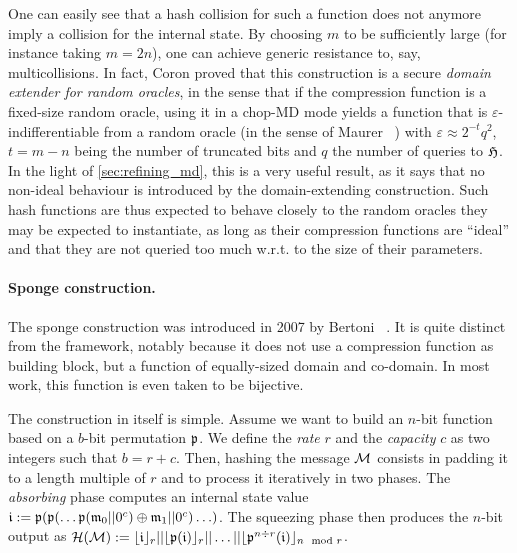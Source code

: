 One can easily see that a hash collision for such a function does not anymore imply a collision for the internal state. By choosing $m$ to be sufficiently large (for instance taking $m = 2n$),
one can achieve generic resistance to, say, multicollisions. In fact, Coron \etal proved that this construction is a secure \emph{domain extender for random oracles}, in the sense that
if the compression function is a fixed-size random oracle, using it in a chop-MD mode yields a function that is $\varepsilon$-indifferentiable from a random oracle (in the sense of Maurer \etal~\cite{DBLP:conf/tcc/MaurerRH04})
with $\varepsilon \approx 2^{-t}q^2$, $t = m - n$ being the number of truncated bits and $q$ the number of queries to $\operatorname{\mathfrak{H}}$. In the light of \autoref{sec:refining_md}, this is a very useful result, as it
says that no non-ideal behaviour is introduced by the domain-extending construction. Such hash functions are thus expected to behave closely to the random oracles they may be expected to instantiate, as long as
their compression functions are ``ideal'' and that they are not queried too much w.r.t. to the size of their parameters.

\paragraph{Sponge construction.} The sponge construction was introduced in 2007 by Bertoni \etal~\cite{SpongeFunctions}. It is quite distinct from the \merkdam framework, notably because it does not use a compression
function as building block, but a function of equally-sized domain and co-domain. In most work, this function is even taken to be bijective.

The construction in itself is simple. Assume we want to build an $n$-bit function based on a $b$-bit permutation $\operatorname{\mathfrak{p}}$. We define the \emph{rate} $r$ and the \emph{capacity} $c$ as two integers such that
$b = r + c$. Then, hashing the message $\mathcal{M}$ consists in padding it to a length multiple of $r$ and to process it iteratively
in two phases. The \emph{absorbing} phase computes an internal state value $\mathfrak{i} := \operatorname{\mathfrak{p}}(\operatorname{\mathfrak{p}}(\ldots\operatorname{\mathfrak{p}}(\mathfrak{m}_0||0^c)\oplus\mathfrak{m}_1||0^c)\ldots)$. The squeezing phase then produces the
$n$-bit output as $\operatorname{\mathcal{H}}(\mathcal{M}) := \lfloor\mathfrak{i}\rfloor_r||\lfloor\operatorname{\mathfrak{p}}(\mathfrak{i})\rfloor_r||\ldots||\lfloor\operatorname{\mathfrak{p}}^{n \div r}(\mathfrak{i})\rfloor_{n \mod r}$.

